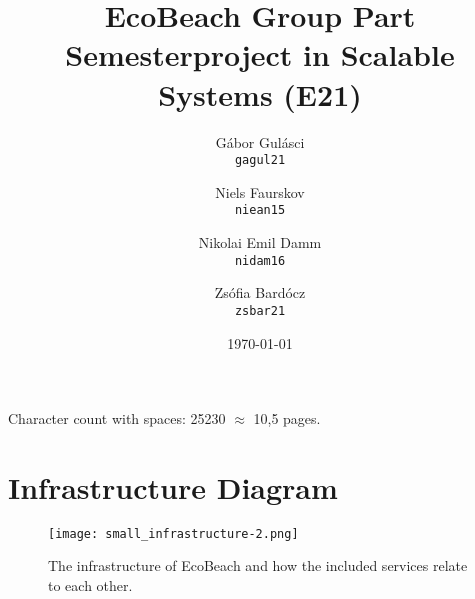 \documentclass[12pt, oneside, notitlepage]{book}
\title{EcoBeach Group Part \\
    \large Semesterproject in Scalable Systems (E21)}
\author{
    Gábor Gulásci\\
    \texttt{gagul21}
    \and
    Niels Faurskov\\
    \texttt{niean15}
    \and
    Nikolai Emil Damm\\
    \texttt{nidam16}
    \and
    Zsófia Bardócz\\
    \texttt{zsbar21}    
}
\date{\today}
\begin{document}
\begin{titlingpage}
    \maketitle
    \begin{center}
        Character count with spaces: 25230 $\approx$ 10,5 pages.
    \end{center}
\end{titlingpage}
\frontmatter

\tableofcontents

\mainmatter




\printnoidxglossary[type=acronym]
\printbibliography[heading=bibintoc]

\appendix
{}
\chapter{Infrastructure Diagram}\label{ch:infrastructure-diagram}
\begin{figure}[h!]
    \centering
    \texttt{[image: small\_infrastructure-2.png]}
    \caption{The infrastructure of EcoBeach and how the included services relate to each other.}
\end{figure}
\restoregeometry
\end{document}
